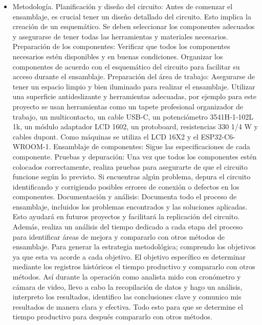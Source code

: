     \begin{itemize}
    \item Metodología. Planificación y diseño del circuito: Antes de comenzar el ensamblaje, es crucial tener un diseño detallado del circuito. Esto implica la creación de un esquemático. Se deben seleccionar los componentes adecuados y asegurarse de tener todas las herramientas y materiales necesarios.
    Preparación de los componentes: Verificar que todos los componentes necesarios estén disponibles y en buenas condiciones. Organizar los componentes de acuerdo con el esquemático del circuito para facilitar su acceso durante el ensamblaje.
    Preparación del área de trabajo: Asegurarse de tener un espacio limpio y bien iluminado para realizar el ensamblaje. Utilizar una superficie antideslizante y herramientas adecuadas, por ejemplo para este proyecto se usan herramientas como un tapete profesional organizador de trabajo, un multicontacto, un cable USB-C, un potenciómetro 3541H-1-102L 1k, un módulo adaptador LCD 1602, un protoboard, resistencias 330 1/4 W y cables dupont. Como máquinas se utiliza el LCD 16X2 y el ESP32-C6-WROOM-1. 
    Ensamblaje de componentes: Sigue las especificaciones de cada componente. 
    Pruebas y depuración: Una vez que todos los componentes estén colocados correctamente, realiza pruebas para asegurarte de que el circuito funcione según lo previsto. Si encuentras algún problema, depura el circuito identificando y corrigiendo posibles errores de conexión o defectos en los componentes. 
    Documentación y análisis: Documenta todo el proceso de ensamblaje, incluidos los problemas encontrados y las soluciones aplicadas. Esto ayudará en futuros proyectos y facilitará la replicación del circuito. Además, realiza un análisis del tiempo dedicado a cada etapa del proceso para identificar áreas de mejora y compararlo con otros métodos de ensamblaje.
    Para generar la estrategia metodológica; comprendo los objetivos ya que esta va acorde a cada objetivo. El objetivo específico es determinar mediante los registros históricos el tiempo productivo y compararlo con otros métodos. Así durante la operación como analista mido con cronómetro y cámara de video, llevo a cabo la recopilación de datos y hago un análisis, interpreto los resultados, identifico las conclusiones clave y comunico mis resultados de manera clara y efectiva. Todo esto para que se determine el tiempo productivo para después compararlo con otros métodos.
    

\end{itemize}

